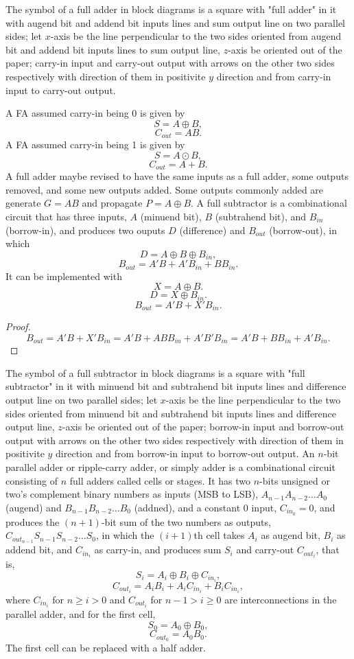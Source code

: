 \documentclass[a4paper,12pt]{report}
\begin{document}
The symbol of a full adder in block diagrams is a square with "full adder" in it with augend bit and addend bit inputs lines and sum output line on two parallel sides; let $x$-axis be the line perpendicular to the two sides oriented from augend bit and addend bit inputs lines to sum output line, $z$-axis be oriented out of the paper; carry-in input and carry-out output with arrows on the other two sides respectively with direction of them in positivite $y$ direction and from carry-in input to carry-out output.

A FA assumed carry-in being 0 is given by
\[S=A\oplus B,\]
\[C_{out}=AB.\]
A FA assumed carry-in being 1 is given by
\[S=A\odot B,\]
\[C_{out}=A+B.\]
A full adder maybe revised to have the same inputs as a full adder, some outputs removed, and some new outputs added. Some outputs commonly added are generate $G=AB$ and propagate $P=A\oplus B$.
A full subtractor is a combinational circuit that has three inputs, $A$ (minuend bit), $B$ (subtrahend bit), and $B_{in}$ (borrow-in), and produces two ouputs $D$ (difference) and $B_{out}$ (borrow-out), in which
\[D=A\oplus B\oplus B_{in},\]
\[B_{out}=A'B+A'B_{in}+BB_{in}.\]
It can be implemented with
\[X=A\oplus B.\]
\[D=X\oplus B_{in}.\]
\[B_{out}=A'B+X'B_{in}.\]
\begin{proof}
\[B_{out}=A'B+X'B_{in}=A'B+ABB_{in}+A'B'B_{in}=A'B+BB_{in}+A'B_{in}.\]
\end{proof}

The symbol of a full subtractor in block diagrams is a square with "full subtractor" in it with minuend bit and subtrahend bit inputs lines and difference output line on two parallel sides; let $x$-axis be the line perpendicular to the two sides oriented from minuend bit and subtrahend bit inputs lines and difference output line, $z$-axis be oriented out of the paper; borrow-in input and borrow-out output with arrows on the other two sides respectively with direction of them in positivite $y$ direction and from borrow-in input to borrow-out output.
An $n$-bit parallel adder or ripple-carry adder, or simply adder is a combinational circuit consisting of $n$ full adders called cells or stages. It has two $n$-bits unsigned or two's complement binary numbers as inputs (MSB to LSB), $A_{n-1}A_{n-2}\ldots A_0$ (augend) and $B_{n-1}B_{n-2}\ldots B_0$ (addned), and a constant $0$ input, $C_{in_0}=0$, and produces the $(n+1)$-bit sum of the two numbers as outputs, $C_{out_{n-1}}S_{n-1}S_{n-2}\ldots S_0$, in which the $(i+1)$th cell takes $A_i$ as augend bit, $B_i$ as addend bit, and $C_{in_i}$ as carry-in, and produces sum $S_i$ and carry-out $C_{out_i}$, that is,
\[S_i=A_i\oplus B_i\oplus C_{in_i},\]
\[C_{out_i}=A_iB_i+A_iC_{in_i}+B_iC_{in_i},\]
where $C_{in_i}$ for $n\geq i>0$ and $C_{out_i}$ for $n-1>i\geq 0$ are interconnections in the parallel adder, and for the first cell,
\[S_0=A_0\oplus B_0,\]
\[C_{out_0}=A_0B_0.\]
The first cell can be replaced with a half adder.
\end{document}
